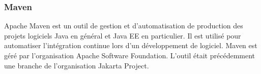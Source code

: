 \documentclass[a4paper]{report}
\begin{document}
\begin{spacing}{2}
\subsubsection{Maven}
\begin{minipage}{0.2\textwidth}
	\begin{minipage}{\linewidth}
	\end{minipage}
\end{minipage}
\hfill
\begin{minipage}{0.75\textwidth}
Apache Maven est un outil de gestion et d'automatisation de production des projets logiciels Java en général et Java EE en particulier. Il est utilisé pour automatiser l'intégration continue lors d'un développement de logiciel. Maven est géré par l'organisation Apache Software Foundation. L'outil était précédemment une branche de l'organisation Jakarta Project.\\
\end{minipage}\\

\end{spacing}
\end{document}
